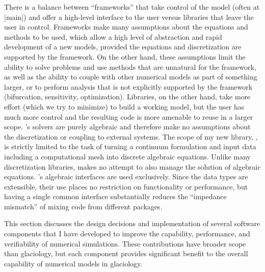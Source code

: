 There is a balance between ``frameworks'' that take control of the model (often at \cfunc|main|) and offer a high-level interface to the user versus libraries that leave the user in control.
Frameworks make many assumptions about the equations and methods to be used, which allow a high level of abstraction and rapid development of a new models, provided the equations and discretization are supported by the framework.
On the other hand, these assumptions limit the ability to solve problems and use methods that are unnatural for the framework, as well as the ability to couple with other numerical models as part of something larger, or to perform analysis that is not explicitly supported by the framework (\eg bifurcation, sensitivity, optimization).
Libraries, on the other hand, take more effort (which we try to minimize) to build a working model, but the user has much more control and the resulting code is more amenable to reuse in a larger scope.
{\PETSc}'s solvers are purely algebraic and therefore make no assumptions about the discretization or coupling to external systems.
The scope of my new library, \Dohp, is strictly limited to the task of turning a continuum formulation and input data including a computational mesh into discrete algebraic equations.
Unlike many discretization libraries, {\Dohp} makes no attempt to also manage the solution of algebraic equations.
\PETSc's algebraic interfaces are used exclusively.
Since the data types are extensible, their use places no restriction on functionality or performance, but having a single common interface substantially reduces the ``impedance mismatch'' of mixing code from different packages.

This section discusses the design decisions and implementation of several software components that I have developed to improve the capability, performance, and verifiability of numerical simulations.
These contributions have broader scope than glaciology, but each component provides significant benefit to the overall capability of numerical models in glaciology.
